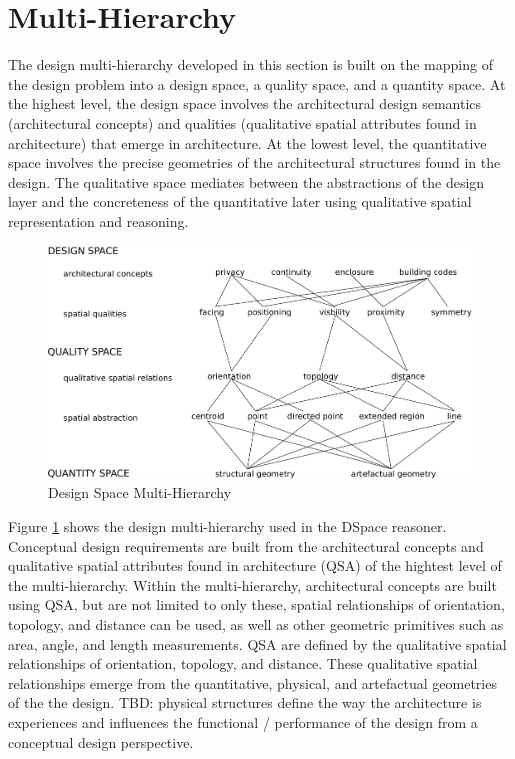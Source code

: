 \documentclass[12pt]{ucthesis}
\begin{document}
\section{Multi-Hierarchy}
The design multi-hierarchy developed in this section is built on the mapping of the design problem into a design space, a quality space, and a quantity space. At the highest level, the design space involves the architectural design semantics (architectural concepts) and qualities (qualitative spatial attributes found in architecture) that emerge in architecture. At the lowest level, the quantitative space involves the precise geometries of the architectural structures found in the design. The qualitative space mediates between the abstractions of the design layer and the concreteness of the quantitative later using qualitative spatial representation and reasoning.
 
\begin{figure}[H]
\centering
\includegraphics[width=140mm]{hierarchy2}
\caption{Design Space Multi-Hierarchy}
\label{hierarchy}
\end{figure}

Figure \ref{hierarchy} shows the design multi-hierarchy used in the DSpace reasoner. Conceptual design requirements are built from the architectural concepts and qualitative spatial attributes found in architecture (QSA) of the hightest level of the multi-hierarchy. Within the multi-hierarchy, architectural concepts are built using QSA, but are not limited to only these, spatial relationships of orientation, topology, and distance can be used, as well as other geometric primitives such as area, angle, and length measurements. QSA are defined by the qualitative spatial relationships of orientation, topology, and distance. These qualitative spatial relationships emerge from the quantitative, physical, and artefactual geometries of the the design. TBD: physical structures define the way the architecture is experiences and influences the functional / performance of the design from a conceptual design perspective.
\end{document}
